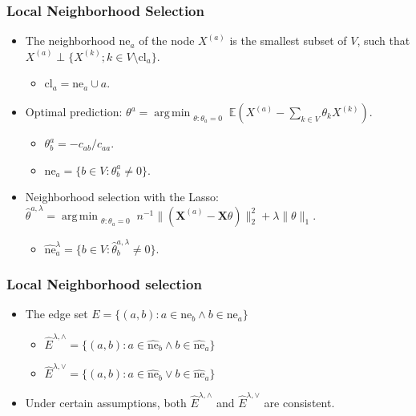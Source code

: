 \documentclass{beamer}
\DeclareMathOperator*{\argmin}{arg\,min}
\newcommand{\Exp}{{\mathbb{E}}}
\begin{document}
\begin{frame}
\frametitle{Local Neighborhood Selection}

\begin{itemize}
\item The neighborhood $\text{ne}_a$ of the node $X^{(a)}$ is the smallest subset of $V$, such that $ X^{(a)} \perp \{ X^{(k)}; k \in V\setminus \text{cl}_a \} $.
    \begin{itemize}
    \item $\text{cl}_a = \text{ne}_a \cup {a}$.
    \end{itemize}
    
\item Optimal prediction: $\theta^{a} = \argmin_{\substack{\theta: \theta_a = 0}} \Exp(X^{(a)} - \sum_{k \in V} \theta_k X^{(k)}) $.
    \begin{itemize}
    \item $\theta_b^a = - c_{ab} / c_{aa}$.
    \item $\text{ne}_a = \{ b \in V: \theta_b^a \neq 0 \}$.
    \end{itemize}    
    
\item Neighborhood selection with the Lasso: $\hat{\theta}^{a, \lambda} = \argmin_{\substack{\theta: \theta_a = 0}} n^{-1} \|(\mathbf{X}^{(a)} - \mathbf{X} \theta) \|_2^2 + \lambda \| \theta \|_1$.   
    \begin{itemize}
    \item $\hat{\text{ne}}_a^{\lambda} = \{ b \in V: \hat{\theta}_b^{a, \lambda} \neq 0 \}$.
    \end{itemize}    
\end{itemize}

\end{frame}


\begin{frame}
\frametitle{Local Neighborhood selection}

\begin{itemize}
\item The edge set $E = \{ (a, b): a \in \text{ne}_b \wedge b \in \text{ne}_a \}$
    \begin{itemize}
    \item $\hat{E}^{\lambda, \wedge} = \{ (a, b): a \in \hat{\text{ne}}_b \wedge b \in \hat{\text{ne}}_a \}$
    \item $\hat{E}^{\lambda, \vee} = \{ (a, b): a \in \hat{\text{ne}}_b \vee b \in \hat{\text{ne}}_a \}$
    \end{itemize}
\item Under certain assumptions, both $\hat{E}^{\lambda, \wedge}$ and $\hat{E}^{\lambda, \vee}$ are consistent.    
\end{itemize}

\end{frame}
\end{document}
